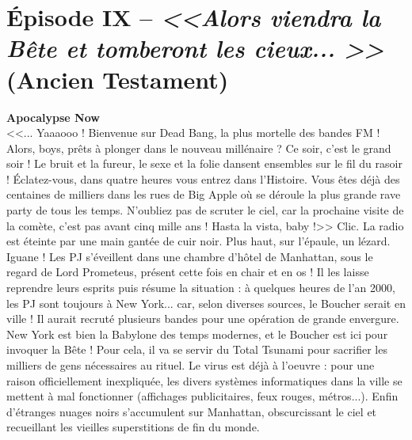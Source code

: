\documentclass[11pt,twoside,a4paper]{book}
\begin{document}
\clearpage

\section*{{\'E}pisode IX -- \emph{<<\textbf{Alors viendra la B{\^e}te et tomberont les cieux... }>>} (Ancien Testament)}


\textbf{\large Apocalypse Now}~\\

<<... Yaaaooo ! Bienvenue sur Dead Bang, la plus mortelle des bandes FM ! Alors, boys, pr{\^e}ts {\`a} plonger dans le nouveau mill{\'e}naire ? Ce soir, c'est le grand soir ! Le bruit et la fureur, le sexe et la folie dansent ensembles sur le fil du rasoir ! {\'E}clatez-vous, dans quatre heures vous entrez dans l'Histoire. Vous {\^e}tes d{\'e}j{\`a} des centaines de milliers dans les rues de Big Apple o{\`u} se d{\'e}roule la plus grande rave party de tous les temps. N'oubliez pas de scruter le ciel, car la prochaine visite de la com{\`e}te, c'est pas avant cinq mille ans ! Hasta la vista, baby !>> Clic. La radio est {\'e}teinte par une main gant{\'e}e de cuir noir. Plus haut, sur l'{\'e}paule, un l{\'e}zard. Iguane ! Les PJ s'{\'e}veillent dans une chambre d'h{\^o}tel de Manhattan, sous le regard de Lord Prometeus, pr{\'e}sent cette fois en chair et en os ! Il les laisse reprendre leurs esprits puis r{\'e}sume la situation : {\`a} quelques heures de l'an 2000, les PJ sont toujours {\`a} New York... car, selon diverses sources, le Boucher serait en ville ! Il aurait recrut{\'e} plusieurs bandes pour une op{\'e}ration de grande envergure.~\\

New York est bien la Babylone des temps modernes, et le Boucher est ici pour invoquer la B{\^e}te ! Pour cela, il va se servir du Total Tsunami pour sacrifier les milliers de gens n{\'e}cessaires au rituel. Le virus est d{\'e}j{\`a} {\`a} l'oeuvre : pour une raison officiellement inexpliqu{\'e}e, les divers syst{\`e}mes informatiques dans la ville se mettent {\`a} mal fonctionner (affichages publicitaires, feux rouges, m{\'e}tros...). Enfin d'{\'e}tranges nuages noirs s'accumulent sur Manhattan, obscurcissant le ciel et recueillant les vieilles superstitions de fin du monde.~\\
\end{document}
